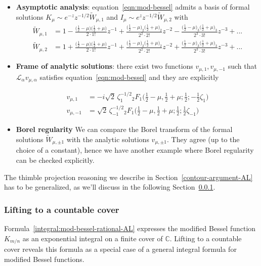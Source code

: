 \documentclass{article}
\theoremstyle{definition}
\newcommand{\C}{\mathbb{C}}
\newcommand{\laplace}{\mathcal{L}}
\begin{document}
\begin{itemize}
 \item \textbf{Asymptotic analysis}: equation~\eqref{eqn:mod-bessel} admits a basis of formal solutions $K_{\mu}\sim e^{-z} z^{-1/2} \tilde{W}_{\mu, 1}$ and $I_{\mu} \sim e^z z^{-1/2} \tilde{W}_{\mu, 2}$ with 
 \begin{align*}
 \tilde{W}_{\mu,1} &= 1- \frac{\big(\tfrac{1}{2}-\mu\big)\big(\frac{1}{2}+\mu\big)}{2 \cdot 1!} z^{-1} + \frac{\big(\tfrac{1}{2}-\mu\big)_2\big(\frac{1}{2}+\mu\big)_2}{2^2 \cdot 2!} z^{-2} - \frac{\big(\tfrac{1}{2}-\mu\big)_3\big(\frac{1}{2}+\mu\big)_3}{2^3 \cdot 3!} z^{-3}+...\\
 \tilde{W}_{\mu,2} &= 1+\frac{\big(\tfrac{1}{2}-\mu\big)\big(\frac{1}{2}+\mu\big)}{2 \cdot 1!} z^{-1} + \frac{\big(\tfrac{1}{2}-\mu\big)_2\big(\frac{1}{2}+\mu\big)_2}{2^2 \cdot 2!} z^{-2}+ \frac{\big(\tfrac{1}{2}-\mu\big)_3\big(\frac{1}{2}+\mu\big)_3}{2^3 \cdot 3!} z^{-3} + ...
\end{align*}   
 \item  \textbf{Frame of analytic solutions}: there exist two functions $v_{\mu, 1}, v_{\mu, -1}$ such that $\laplace_{\alpha}v_{\mu, \alpha}$ satisfies equation~\eqref{eqn:mod-bessel} and they are explicitly 

\begin{align*}
v_{\mu, 1}&=-i\sqrt{2}\,\zeta_{1}^{-1/2}  {}_2F_1\big(\tfrac{1}{2}-\mu, \tfrac{1}{2}+\mu; \tfrac{1}{2}; -\tfrac{1}{2}\zeta_{1}\big)\\
v_{\mu, -1}&=\sqrt{2}\,\zeta_{-1}^{-1/2}  {}_2F_1\big(\tfrac{1}{2}-\mu, \tfrac{1}{2}+\mu; \tfrac{1}{2}; \tfrac{1}{2}\zeta_{-1}\big)
\end{align*}
\item \textbf{Borel regularity} We can compare the Borel transform of the formal solutions $\tilde{W}_{\mu,\pm1}$ with the analytic solutions $v_{\mu,\pm 1}$. They agree (up to the choice of a constant), hence we have another example where Borel regularity can be checked explicitly. 
\end{itemize}

The thimble projection reasoning we describe in Section~\ref{contour-argument-AL} has to be generalized, as we’ll discuss in the following Section~\ref{countable-cover}. 



\subsubsection{Lifting to a countable cover}\label{countable-cover}
Formula~\eqref{integral:mod-bessel-rational-AL} expresses the modified Bessel function $K_{m/n}$ as an exponential integral on a finite cover of $\C$. Lifting to a countable cover reveals this formula as a special case of a general integral formula for modified Bessel functions.
\end{document}
